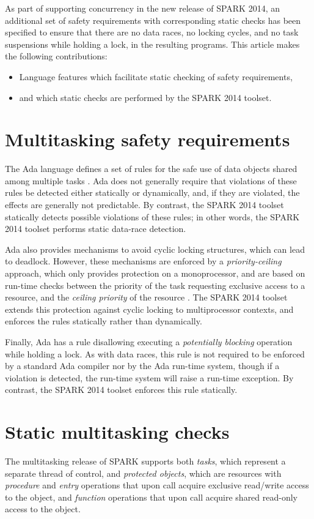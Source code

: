 \documentclass[10pt,conference,compsocconf]{IEEEtran}
\begin{document}
As part of supporting concurrency in the new release of SPARK 2014, an
additional set of safety requirements with corresponding static checks has
been specified to ensure that there are no data races, no locking cycles,
and no task suspensions while holding a lock, in the resulting programs.
This article makes the following contributions:
\begin{itemize}
\item Language features which facilitate static checking of safety
  requirements,
\item and which static checks are performed by the SPARK 2014 toolset.
\end{itemize}

\section{Multitasking safety requirements}
The Ada language defines a set of rules for the safe use of data objects
shared among multiple tasks \cite{lrm}. Ada does not generally require that
violations of these rules be detected either statically or dynamically,
and, if they are violated, the effects are generally not predictable. By
contrast, the SPARK 2014 toolset statically detects possible violations of
these rules; in other words, the SPARK 2014 toolset performs static
data-race detection.

Ada also provides mechanisms to avoid cyclic locking structures, which can
lead to deadlock. However, these mechanisms are enforced by a
\emph{priority-ceiling} approach, which only provides protection on a
monoprocessor, and are based on run-time checks between the priority of the
task requesting exclusive access to a resource, and the \emph{ceiling
  priority} of the resource \cite{mccormick2011building}. The SPARK 2014
toolset extends this protection against cyclic locking to multiprocessor
contexts, and enforces the rules statically rather than dynamically.

Finally, Ada has a rule disallowing executing a \emph{potentially blocking}
operation while holding a lock. As with data races, this rule is not
required to be enforced by a standard Ada compiler nor by the Ada run-time
system, though if a violation is detected, the run-time system will raise a
run-time exception. By contrast, the SPARK 2014 toolset enforces this rule
statically.

\section{Static multitasking checks}
The multitasking release of SPARK supports both \emph{tasks}, which
represent a separate thread of control, and \emph{protected objects}, which
are resources with \emph{procedure} and \emph{entry} operations that upon
call acquire exclusive read/write access to the object, and \emph{function}
operations that upon call acquire shared read-only access to the object.
\end{document}
